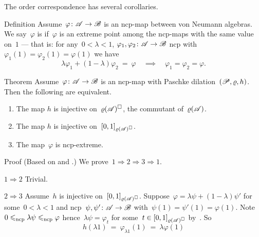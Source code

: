 \begin{parsec}%
\begin{point}%
The order correspondence 
    has several corollaries.
\end{point}
\begin{point}{Definition}%
Assume~$\varphi\colon \mathscr{A} \to \mathscr{B}$ is an ncp-map between von Neumann
    algebras.
We say~$\varphi$ is 
    if~$\varphi$ is an extreme point among
    the ncp-maps with the same value on~$1$ ---
    that is:
    for any~$0 < \lambda < 1$, $\varphi_1,\varphi_2\colon \mathscr{A} \to \mathscr{B}$
    ncp with~$\varphi_1(1) = \varphi_2(1) = \varphi(1)$
    we have
    \begin{equation*}
    \lambda \varphi_1 + (1-\lambda)\varphi_2 \ =\  \varphi
    \quad \implies \quad
    \varphi_1=\varphi_2=\varphi.
    \end{equation*}
\end{point}
\begin{point}{Theorem}%
Assume~$\varphi\colon \mathscr{A} \to \mathscr{B}$ is an ncp-map
    with Paschke dilation~$(\mathscr{P}, \varrho, h)$.
Then the following are equivalent.
\begin{enumerate}
    \item The map $h$ is injective on~$\varrho(\mathscr{A})^\square$,
                the commutant of~$\varrho(\mathscr{A})$.
    \item The map $h$ is injective on~$[0,1]_{\varrho(\mathscr{A})^\square}$.
    \item The map~$\varphi$ is ncp-extreme.
\end{enumerate}
\begin{point}{Proof}%
(Based on \cite[Prop.~1.4.6]{arveson}
    and \cite[Thm.~5.4]{paschke}.)
We prove~$1 \Rightarrow 2 \Rightarrow 3 \Rightarrow 1$.
\begin{point}{$1 \Rightarrow 2$}%
Trivial.
\end{point}
\begin{point}{$2 \Rightarrow 3$}%
Assume~$h$ is injective on~$[0,1]_{\varrho(\mathscr{A})^\square}$.
Suppose~$\varphi = \lambda \psi + (1 - \lambda) \psi'$
    for some~$0 < \lambda < 1$
    and ncp~$\psi,\psi'\colon \mathscr{A} \to \mathscr{B}$
    with~$\psi(1) = \psi'(1) = \varphi(1)$.
Note~$0 \leqslant_{\mathrm{ncp}} \lambda\psi \leqslant_{\mathrm{ncp}} \varphi$
hence~$\lambda\psi = \varphi_t$ for some~$t \in [0,1]_{\varrho(\mathscr{A})^\square}$
by~.
So
\begin{equation*}
    h(\lambda 1)
    \ =\  \varphi_{\lambda1}(1) \ =\  \lambda \varphi(1) 

\end{equation*}
\end{point}
\end{point}
\end{point}
\end{parsec}
